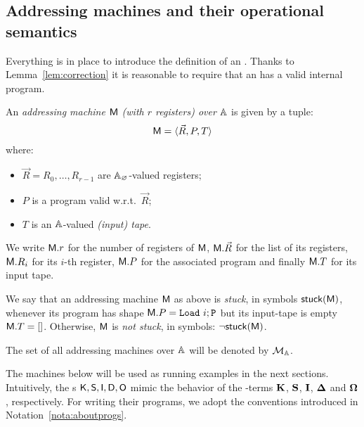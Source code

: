 \subsection{Addressing machines and their operational semantics}

Everything is in place to introduce the definition of an \am.
Thanks to Lemma~\ref{lem:correction} it is reasonable to require that an \am{} has a valid internal program.

\begin{defi}\label{def:AM}
\bsub
\item
	An \emph{addressing machine $\mathsf M$ (with $r$ registers) over $\mathbb{A}$} is given by a tuple:
\[
	\mathsf M = \langle \vec R,P,T\rangle
\] where:
\begin{itemize}
\item
	$\vec R = R_0,\dots,R_{r-1}$ are $\mathbb{A}_\varnothing$-valued registers;
\item
	$P$ is a program valid w.r.t.\ $\vec R$;
\item
	$T$ is an $\mathbb{A}$-valued \emph{(input) tape}.
\end{itemize}
\item
	We write $\mathsf M.r$ for the number of registers of $\mathsf M$, $\mathsf M.\vec R$ for the list of its registers, $\mathsf M.R_i$ for its $i$-th register, $\mathsf M.P$ for the associated program and finally $\mathsf M.T$ for its input tape.
\item
	We say that an addressing machine $\mathsf M$ as above is \emph{stuck}, in symbols $\mathsf{stuck}(\mathsf M)$, whenever its program has shape $\mathsf M.P = \mathtt{Load}~i;\mathtt{P}$ but its input-tape is empty $\mathsf M.T = []$. Otherwise, $\mathsf M$ is \emph{not stuck}, in symbols: $\lnot\mathsf{stuck}(\mathsf M)$.
\item
	The set of all addressing machines over $\mathbb{A}$ will be denoted by $\mathcal{M}_{\mathbb{A}}$.
\esub
\end{defi}

\noindent
The machines below will be used as running examples in the next sections.
Intuitively, the \am s $\mathsf K,\mathsf S,\mathsf{I},\mathsf{D},\mathsf{O}$ mimic the behavior of the \lam-terms ${\mathbf{K}}$, ${\mathbf{S}}$, ${\mathbf{I}}$, ${\mathbf{\Delta}}$ and ${\mathbf{\Omega}}$, respectively. For writing their programs, we adopt the conventions introduced in Notation~\ref{nota:aboutprogs}.

